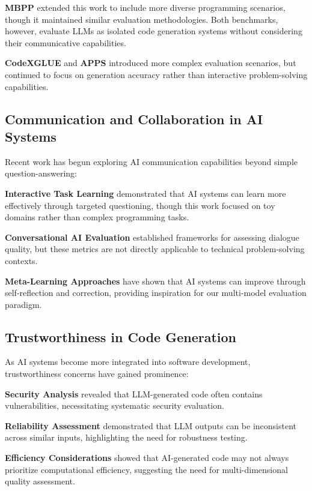 \documentclass[conference]{IEEEtran}
\begin{document}
\textbf{MBPP} \cite{austin2021program} extended this work to include more diverse programming scenarios, though it maintained similar evaluation methodologies. Both benchmarks, however, evaluate LLMs as isolated code generation systems without considering their communicative capabilities.

\textbf{CodeXGLUE} \cite{lu2021codexglue} and \textbf{APPS} \cite{hendrycks2021measuring} introduced more complex evaluation scenarios, but continued to focus on generation accuracy rather than interactive problem-solving capabilities.

\subsection{Communication and Collaboration in AI Systems}

Recent work has begun exploring AI communication capabilities beyond simple question-answering:

\textbf{Interactive Task Learning} \cite{wang2021towards} demonstrated that AI systems can learn more effectively through targeted questioning, though this work focused on toy domains rather than complex programming tasks.

\textbf{Conversational AI Evaluation} \cite{adiwardana2020towards} established frameworks for assessing dialogue quality, but these metrics are not directly applicable to technical problem-solving contexts.

\textbf{Meta-Learning Approaches} \cite{finn2017model} have shown that AI systems can improve through self-reflection and correction, providing inspiration for our multi-model evaluation paradigm.

\subsection{Trustworthiness in Code Generation}

As AI systems become more integrated into software development, trustworthiness concerns have gained prominence:

\textbf{Security Analysis} \cite{pearce2022asleep} revealed that LLM-generated code often contains vulnerabilities, necessitating systematic security evaluation.

\textbf{Reliability Assessment} \cite{chen2021codex} demonstrated that LLM outputs can be inconsistent across similar inputs, highlighting the need for robustness testing.

\textbf{Efficiency Considerations} \cite{nijkamp2022codegen} showed that AI-generated code may not always prioritize computational efficiency, suggesting the need for multi-dimensional quality assessment.
\end{document}
